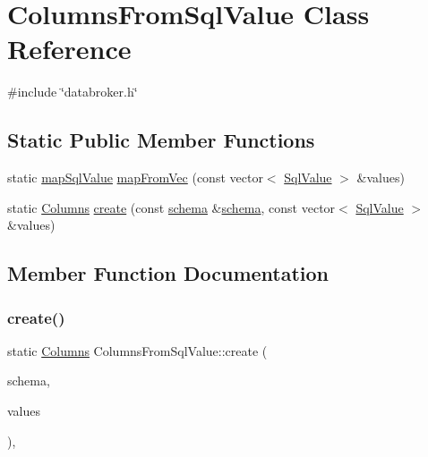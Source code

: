 \hypertarget{classColumnsFromSqlValue}{}\section{Columns\+From\+Sql\+Value Class Reference}
\label{classColumnsFromSqlValue}


{\ttfamily \#include \char`\"{}databroker.\+h\char`\"{}}

\subsection*{Static Public Member Functions}
\begin{DoxyCompactItemize}
\item 
static \mbox{\hyperlink{datadefinition_8h_a09c0cd32f8797a9ad3df7daa788656cc}{map\+Sql\+Value}} \mbox{\hyperlink{classColumnsFromSqlValue_a2bd2302c62e85d239d5d4debc92e5588}{map\+From\+Vec}} (const vector$<$ \mbox{\hyperlink{structSqlValue}{Sql\+Value}} $>$ \&values)
\item 
static \mbox{\hyperlink{classColumns}{Columns}} \mbox{\hyperlink{classColumnsFromSqlValue_ad6e30f90a769968da9e2de5181eeb8ca}{create}} (const \mbox{\hyperlink{datadefinition_8h_aec40b8d2d2c045d8af617ce94864651f}{schema}} \&\mbox{\hyperlink{datadefinition_8h_aec40b8d2d2c045d8af617ce94864651f}{schema}}, const vector$<$ \mbox{\hyperlink{structSqlValue}{Sql\+Value}} $>$ \&values)
\end{DoxyCompactItemize}


\subsection{Member Function Documentation}
\mbox{\label{classColumnsFromSqlValue_ad6e30f90a769968da9e2de5181eeb8ca}} 
\subsubsection{\texorpdfstring{create()}{create()}}
{\footnotesize\ttfamily static \mbox{\hyperlink{classColumns}{Columns}} Columns\+From\+Sql\+Value\+::create (\begin{DoxyParamCaption}\item[{const \mbox{\hyperlink{datadefinition_8h_aec40b8d2d2c045d8af617ce94864651f}{schema}} \&}]{schema,  }\item[{const vector$<$ \mbox{\hyperlink{structSqlValue}{Sql\+Value}} $>$ \&}]{values }\end{DoxyParamCaption})\hspace{0.3cm}{\ttfamily [inline]}, {\ttfamily [static]}}


